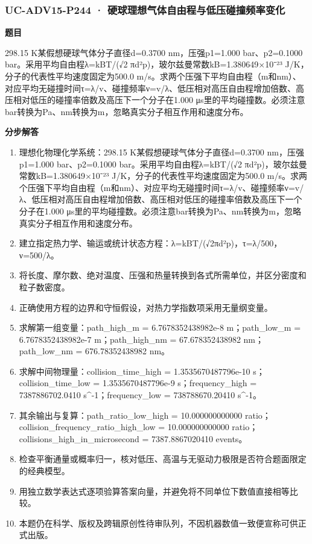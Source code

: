 \documentclass[UTF8,11pt,a4paper]{ctexart}
\begin{document}
\subsubsection*{UC-ADV15-P244 · 硬球理想气体自由程与低压碰撞频率变化}
\noindent\textbf{题目}\par
298.15 K某假想硬球气体分子直径d=0.3700 nm，压强p1=1.000 bar、p2=0.1000 bar。采用平均自由程λ=kBT/(√2 πd²p)，玻尔兹曼常数kB=1.380649×10⁻²³ J/K，分子的代表性平均速度固定为500.0 m/s。求两个压强下平均自由程（m和nm）、对应平均无碰撞时间τ=λ/v、碰撞频率ν=v/λ、低压相对高压自由程增加倍数、高压相对低压的碰撞率倍数及高压下一个分子在1.000 μs里的平均碰撞数。必须注意bar转换为Pa、nm转换为m，忽略真实分子相互作用和速度分布。\par
\medskip\noindent\textbf{分步解答}
\begin{enumerate}
\item 理想化物理化学系统：298.15 K某假想硬球气体分子直径d=0.3700 nm，压强p1=1.000 bar、p2=0.1000 bar。采用平均自由程λ=kBT/(√2 πd²p)，玻尔兹曼常数kB=1.380649×10⁻²³ J/K，分子的代表性平均速度固定为500.0 m/s。求两个压强下平均自由程（m和nm）、对应平均无碰撞时间τ=λ/v、碰撞频率ν=v/λ、低压相对高压自由程增加倍数、高压相对低压的碰撞率倍数及高压下一个分子在1.000 μs里的平均碰撞数。必须注意bar转换为Pa、nm转换为m，忽略真实分子相互作用和速度分布。
\item 建立指定热力学、输运或统计状态方程：λ=kBT/(√2πd²p)，τ=λ/500，ν=500/λ。
\item 将长度、摩尔数、绝对温度、压强和热量转换到各式所需单位，并区分密度和粒子数密度。
\item 正确使用方程的边界和守恒假设，对热力学指数项采用无量纲变量。
\item 求解第一组变量：path\_high\_m = 6.7678352438982e-8 m；path\_low\_m = 6.7678352438982e-7 m；path\_high\_nm = 67.678352438982 nm；path\_low\_nm = 676.78352438982 nm。
\item 求解中间物理量：collision\_time\_high = 1.3535670487796e-10 s；collision\_time\_low = 1.3535670487796e-9 s；frequency\_high = 7387886702.0410 s\textasciicircum{}-1；frequency\_low = 738788670.20410 s\textasciicircum{}-1。
\item 其余输出与复算：path\_ratio\_low\_high = 10.000000000000 ratio；collision\_frequency\_ratio\_high\_low = 10.000000000000 ratio；collisions\_high\_in\_microsecond = 7387.8867020410 events。
\item 检查平衡通量或概率归一，核对低压、高温与无驱动力极限是否符合题面限定的经典模型。
\item 用独立数学表达式逐项验算答案向量，并避免将不同单位下数值直接相等比较。
\item 本题仍在科学、版权及跨辑原创性待审队列，不因机器数值一致便宣称可供正式出版。
\end{enumerate}
\end{document}
